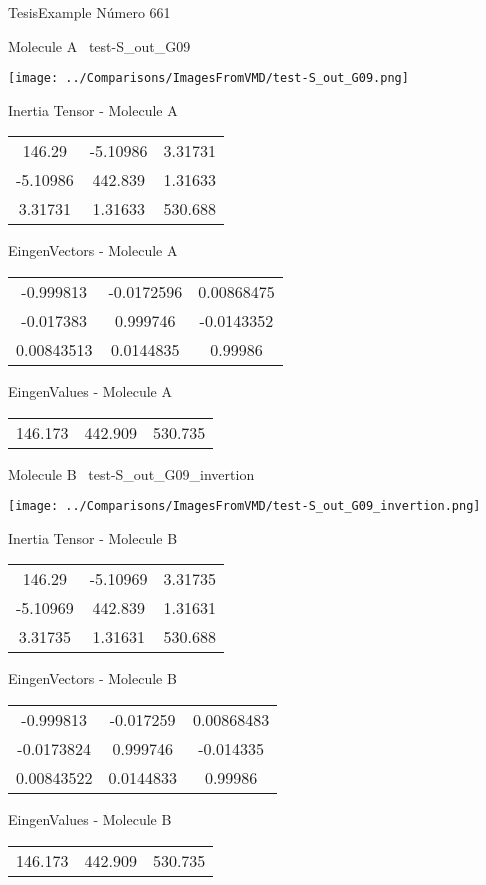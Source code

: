 \vtab[-3cm]
\begin{center}
{\large TesisExample \tab Número 661}
\end{center}
\begin{multicols}{2}
\begin{center}

Molecule A \
test-S\_out\_G09

\texttt{[image: ../Comparisons/ImagesFromVMD/test-S\_out\_G09.png]}

Inertia Tensor - Molecule A \\
\begin{tabular}{|c c c|}
146.29	 & 	-5.10986	 & 	3.31731	 \\
-5.10986	 & 	442.839	 & 	1.31633	 \\
3.31731	 & 	1.31633	 & 	530.688
\end{tabular}

\vtab
 EingenVectors - Molecule A     \\
\begin{tabular}{|c c c|}
-0.999813	 & 	-0.0172596	 & 	0.00868475	 \\
-0.017383	 & 	0.999746	 & 	-0.0143352	 \\
0.00843513	 & 	0.0144835	 & 	0.99986
\end{tabular}

\vtab
 EingenValues - Molecule A     \\
\begin{tabular}{|c c c|}
146.173	 & 	442.909	 & 	530.735	 \\
\end{tabular}
\columnbreak

Molecule B \
test-S\_out\_G09\_invertion

\texttt{[image: ../Comparisons/ImagesFromVMD/test-S\_out\_G09\_invertion.png]}

Inertia Tensor - Molecule B \\
\begin{tabular}{|c c c|}
146.29	 & 	-5.10969	 & 	3.31735	 \\
-5.10969	 & 	442.839	 & 	1.31631	 \\
3.31735	 & 	1.31631	 & 	530.688
\end{tabular}

\vtab
 EingenVectors - Molecule B     \\
\begin{tabular}{|c c c|}
-0.999813	 & 	-0.017259	 & 	0.00868483	 \\
-0.0173824	 & 	0.999746	 & 	-0.014335	 \\
0.00843522	 & 	0.0144833	 & 	0.99986
\end{tabular}

\vtab
 EingenValues - Molecule B     \\
\begin{tabular}{|c c c|}
146.173	 & 	442.909	 & 	530.735	 \\
\end{tabular}

\end{center}
\end{multicols}

